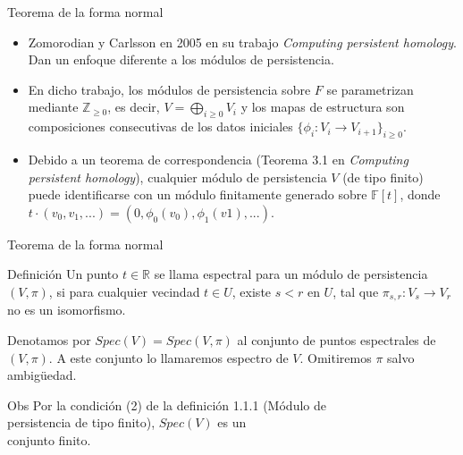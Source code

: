 \documentclass{beamer}
\begin{document}
\begin{frame}{Teorema de la forma normal}
    
    \begin{itemize}    
        \item Zomorodian y Carlsson en 2005 en su trabajo \textit{Computing persistent homology}. Dan un enfoque diferente a los módulos de persistencia.
        \pause
        
        \item En dicho trabajo, los módulos de persistencia sobre $F$ se parametrizan mediante $\mathbb{Z}_{\geq 0}$, es decir, $V=\bigoplus_{i\geq 0}V_{i}$ y los mapas de estructura son composiciones consecutivas de los datos iniciales $\{\phi_{i}:V_{i}\to V_{i+1}\}_{i\geq 0}$.
        \pause

        \item Debido a un teorema de correspondencia (Teorema 3.1 en \textit{Computing persistent homology}), cualquier módulo de persistencia $V$ (de tipo finito) puede identificarse con un módulo finitamente generado sobre $\mathbb{F}[t]$, donde $t\cdot (v_0 , v_1 ,.. .) = (0, \phi_{0}(v_0), \phi_{1}(v1 ),.. .)$.
        
    \end{itemize}
    
\end{frame}

\begin{frame}{Teorema de la forma normal}
    \begin{block}{Definición}
        Un punto $t\in\mathbb{R}$ se llama espectral para un módulo de persistencia $(V, \pi)$, si para cualquier vecindad $t\in U$, existe $s < r$ en $U$, tal que $\pi_{s,r}: V_s\to V_r$ no es un isomorfismo. 
    \end{block}
    \pause 

    Denotamos por $Spec(V) = Spec(V, \pi)$ al conjunto de puntos espectrales de $(V, \pi)$.
    A este conjunto lo llamaremos espectro de $V$. Omitiremos $\pi$ salvo ambig\"uedad.
    \pause

    \begin{block}{Obs}
        Por la condición (2) de la definición 1.1.1 (Módulo de \\
        persistencia de tipo finito), $Spec(V)$ es un \\ conjunto finito.
     \end{block}
     
\end{frame}
\end{document}
